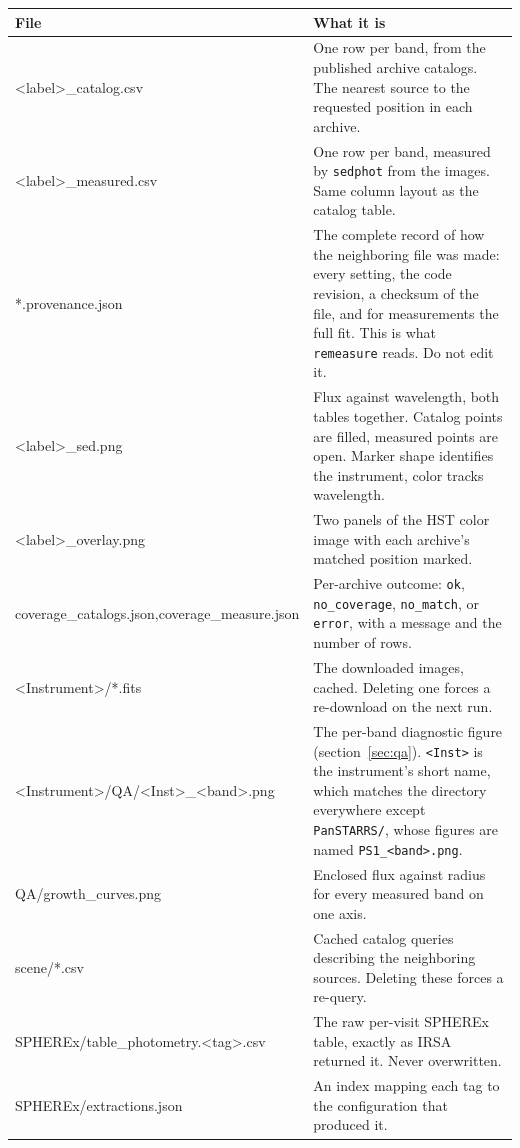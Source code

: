 \documentclass[11pt]{article}
\begin{document}
\begin{longtable}{T{5.4cm} L{8.8cm}}
\toprule
\textbf{\normalfont File} & \textbf{What it is} \\
\midrule
\endhead
<label>\_catalog.csv & One row per band, from the published archive
  catalogs. The nearest source to the requested position in each
  archive. \\[2pt]
<label>\_measured.csv & One row per band, measured by \texttt{sedphot}
  from the images. Same column layout as the catalog table. \\[2pt]
*.provenance.json & The complete record of how the neighboring file was
  made: every setting, the code revision, a checksum of the file, and for
  measurements the full fit. This is what \texttt{remeasure} reads. Do not
  edit it. \\[2pt]
<label>\_sed.png & Flux against wavelength, both tables together. Catalog
  points are filled, measured points are open. Marker shape identifies the
  instrument, color tracks wavelength. \\[2pt]
<label>\_overlay.png & Two panels of the HST color image with each
  archive's matched position marked. \\[2pt]
coverage\_catalogs.json,\newline coverage\_measure.json & Per-archive
  outcome: \texttt{ok}, \texttt{no\_coverage}, \texttt{no\_match}, or
  \texttt{error}, with a message and the number of rows. \\[2pt]
<Instrument>/*.fits & The downloaded images, cached. Deleting one forces a
  re-download on the next run. \\[2pt]
<Instrument>/QA/\newline <Inst>\_<band>.png & The per-band diagnostic
  figure (section~\ref{sec:qa}). \texttt{<Inst>} is the instrument's short name,
  which matches the directory everywhere except \texttt{PanSTARRS/},
  whose figures are named \texttt{PS1\_<band>.png}. \\[2pt]
QA/growth\_curves.png & Enclosed flux against radius for every measured
  band on one axis. \\[2pt]
scene/*.csv & Cached catalog queries describing the neighboring sources.
  Deleting these forces a re-query. \\[2pt]
SPHEREx/table\_photometry.\newline <tag>.csv & The raw per-visit SPHEREx
  table, exactly as IRSA returned it. Never overwritten. \\[2pt]
SPHEREx/extractions.json & An index mapping each tag to the configuration
  that produced it. \\
\bottomrule
\end{longtable}
\end{document}
